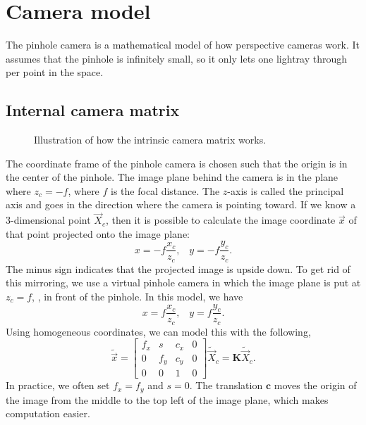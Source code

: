 \section{Camera model} \label{sec:camera-model}

The pinhole camera is a mathematical model of how perspective cameras work.
It assumes that the pinhole is infinitely small, so it only lets one lightray
through per point in the space.

\subsection{Internal camera matrix}

\begin{figure}[ht]
    \centering
    \caption{Illustration of how the intrinsic camera matrix works.}
    \label{fig:internal-camera}
\end{figure}

The coordinate frame of the pinhole camera is chosen such that the origin is in
the center of the pinhole. The image plane behind the camera is in the plane
where $z_c=-f$, where $f$ is the focal distance. The $z$-axis is called the
principal axis and goes in the direction where the camera is pointing toward. If
we know a 3-dimensional point $\vec{X}_c$, then it is possible to calculate
the image coordinate $\vec{x}$ of that point projected onto the image plane: \[
    x=-f\frac{x_c}{z_c}, \;\;\; y=-f\frac{y_c}{z_c}.
\]
The minus sign indicates that the projected image is upside down. To get rid of
this mirroring, we use a virtual pinhole camera in which the image plane is put
at $z_c=f$, \ie, in front of the pinhole. In this model, we have \[
    x=f\frac{x_c}{z_c}, \;\;\; y=f\frac{y_c}{z_c}.
\]
Using homogeneous coordinates, we can model this with the following, \[
    \tilde{\vec{x}} = \begin{bmatrix} f_x & s & c_x & 0 \\ 0 & f_y & c_y & 0 \\ 0
                    & 0 & 1   & 0\end{bmatrix}\tilde{\vec{X}}_c = \bm{K}\tilde{\vec{X}}_c.
\]
In practice, we often set $f_x=f_y$ and $s=0$. The translation $\bm{c}$ moves
the origin of the image from the middle to the top left of the image plane,
which makes computation easier.

